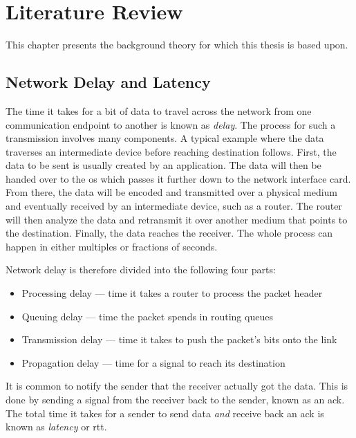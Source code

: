 \chapter{Literature Review}

This chapter presents the background theory for which this thesis is based upon.







\section{Network Delay and Latency}

The time it takes for a bit of data to travel across the network from one communication endpoint to another is known as \textit{delay}. The process for such a transmission involves many components. A typical example where the data traverses an intermediate device before reaching destination follows. First, the data to be sent is usually created by an application. The data will then be handed over to the \gls{os} which passes it further down to the network interface card. From there, the data will be encoded and transmitted over a physical medium and eventually received by an intermediate device, such as a router. The router will then analyze the data and retransmit it over another medium that points to the destination. Finally, the data reaches the receiver. The whole process can happen in either multiples or fractions of seconds.


Network delay is therefore divided into the following four parts:

\begin{itemize}
    \item Processing delay --- time it takes a router to process the packet header
    \item Queuing delay --- time the packet spends in routing queues
    \item Transmission delay --- time it takes to push the packet's bits onto the link
    \item Propagation delay --- time for a signal to reach its destination
\end{itemize}

It is common to notify the sender that the receiver actually got the data. This is done by sending a signal from the receiver back to the sender, known as an \gls{ack}. The total time it takes for a sender to send data \textit{and} receive back an \gls{ack} is known as \textit{latency} or \gls{rtt}.


